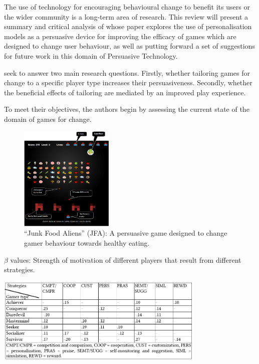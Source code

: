 \documentclass[12pt]{article}
\begin{document}
The use of technology for encouraging behavioural change to benefit its users or the wider community is a long-term area of research. This review will present a summary and critical analysis of \citet{orji2017} whose paper explores the use of personalisation models as a persuasive device for improving the efficacy of games which are designed to change user behaviour, as well as putting forward a set of suggestions for future work in this domain of Persuasive Technology.

\citeauthor{orji2017} seek to answer two main research questions. Firstly, whether tailoring games for change to a specific player type increases their persuasiveness. Secondly, whether the beneficial effects of tailoring are mediated by an improved play experience.

To meet their objectives, the authors begin by assessing the current state of the domain of games for change.

\begin{figure}[H]
\centering
\includegraphics[width=0.4\textwidth]{img/orji2017-junk-food-aliens.png} 
\caption{``Junk Food Aliens'' (JFA): A persuasive game designed to change gamer behaviour towards healthy eating.}\label{fig:orji2017-junk-food-aliens}
\end{figure}

\begin{table}[H]
\centering
\caption{$\beta$ values: Strength of motivation of different players that result from different strategies.}\label{tbl:orji2017-beta-sem}
\includegraphics[width=0.75\textwidth]{img/orji2017-beta-sem.png} 
\end{table}
\end{document}
